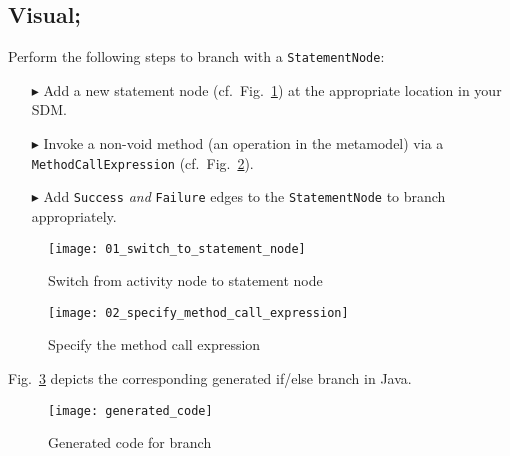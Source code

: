 \clearpage
\hypertarget{conBran vis}{}
\subsection{Visual;}
\visHeader

Perform the following steps to branch with a \texttt{StatementNode}:
\begin{enumerate}
\item[$\blacktriangleright$] Add a new statement node (cf.~Fig.~\ref{fig:cond_statement_node}) at the appropriate location in your SDM.
\item[$\blacktriangleright$] Invoke a non-void method (an operation in the metamodel) via a \texttt{MethodCallExpression} (cf.~Fig.~\ref{fig:cond_method_call}).
\item[$\blacktriangleright$] Add \texttt{Success} \emph{and} \texttt{Failure} edges to the \texttt{StatementNode} to branch appropriately.
\end{enumerate}

\begin{figure}[htp]
\begin{center}
  \texttt{[image: 01\_switch\_to\_statement\_node]}
  \caption{Switch from activity node to statement node}
  \label{fig:cond_statement_node}
\end{center}
\end{figure}

\begin{figure}[htp]
\begin{center}
  \texttt{[image: 02\_specify\_method\_call\_expression]}
  \caption{Specify the method call expression}
  \label{fig:cond_method_call}
\end{center}
\end{figure}

Fig.~\ref{fig:cond_branch_on_op_code} depicts the corresponding generated if/else branch in Java.

\begin{figure}[htp]
\begin{center}
  \texttt{[image: generated\_code]}
  \caption{Generated code for branch}
  \label{fig:cond_branch_on_op_code}
\end{center}
\end{figure}
